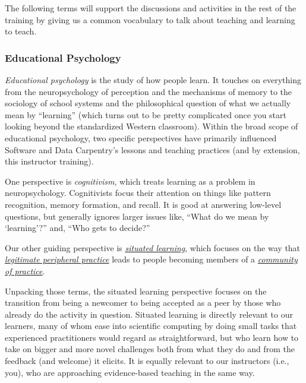 
The following terms will support the discussions and activities in the
rest of the training by giving us a common vocabulary to talk about
teaching and learning to teach.

\subsubsection{Educational Psychology}\label{educational-psychology}

\emph{Educational psychology} is the study of how people learn. It
touches on everything from the neuropsychology of perception and the
mechanisms of memory to the sociology of school systems and the
philosophical question of what we actually mean by ``learning'' (which
turns out to be pretty complicated once you start looking beyond the
standardized Western classroom). Within the broad scope of educational
psychology, two specific perspectives have primarily influenced Software
and Data Carpentry's lessons and teaching practices (and by extension,
this instructor training).

One perspective is \emph{cognitivism}, which treats learning as a
problem in neuropsychology. Cognitivists focus their attention on things
like pattern recognition, memory formation, and recall. It is good at
answering low-level questions, but generally ignores larger issues like,
``What do we mean by `learning'?'' and, ``Who gets to decide?''

Our other guiding perspective is
\emph{\href{https://en.wikipedia.org/wiki/Situated\_learning}{situated
learning}}, which focuses on the way that
\emph{\href{https://en.wikipedia.org/wiki/Legitimate\_peripheral\_participation}{legitimate
peripheral practice}} leads to people becoming members of a
\emph{\href{https://en.wikipedia.org/wiki/Community\_of\_practice}{community
of practice}}.

Unpacking those terms, the situated learning perspective focuses on the
transition from being a newcomer to being accepted as a peer by those
who already do the activity in question. Situated learning is directly
relevant to our learners, many of whom ease into scientific computing by
doing small tasks that experienced practitioners would regard as
straightforward, but who learn how to take on bigger and more novel
challenges both from what they do and from the feedback (and welcome) it
elicits. It is equally relevant to our instructors (i.e., you), who are
approaching evidence-based teaching in the same way.

